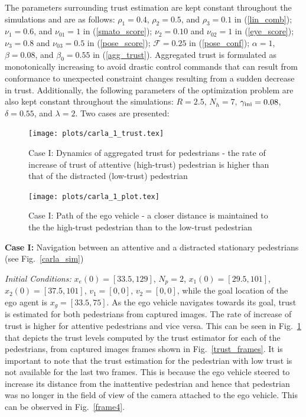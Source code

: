 \documentclass[journal]{IEEEtran}
\begin{document}
The parameters surrounding trust estimation are kept constant throughout the simulations and are as follows: $\rho_1=0.4$, $\rho_2=0.5$, and $\rho_3=0.1$ in (\ref{lin_comb}); $\nu_1=0.6$, and $\nu_{01}=1$ in (\ref{smato_score}); $\nu_2=0.10$ and $\nu_{02}=1$ in (\ref{eye_score}); $\nu_3=0.8$ and $\nu_{03}=0.5$ in (\ref{pose_score}); $\mathcal{F}=0.25$ in (\ref{pose_conf}); $\alpha=1$, $\beta=0.08$, and $\beta_0=0.55$ in (\ref{agg_trust}). Aggregated trust is formulated as monotonically increasing to avoid drastic control commands that can result from conformance to unexpected constraint changes resulting from a sudden decrease in trust. Additionally, the following parameters of the optimization problem are also kept constant throughout the simulations: $R=2.5$, $N_h=7$, $\gamma_{\rm ini}=0.08$, $\delta=0.55$, and $\lambda=2$. Two cases are presented:

\begin{figure}
  \centering
  \texttt{[image: plots/carla\_1\_trust.tex]}
  \caption{Case I: Dynamics of aggregated trust for pedestrians - the rate of increase of trust of attentive (high-trust) pedestrian is higher than that of the distracted (low-trust) pedestrian}
  \label{trust_scene1}
\end{figure}

\begin{figure}
  \centering
  \texttt{[image: plots/carla\_1\_plot.tex]}
  \caption{Case I: Path of the ego vehicle - a closer distance is maintained to the the high-trust pedestrian than to the low-trust pedestrian}
  \label{path_carla1}
\end{figure}

\textbf{Case I:} Navigation between an attentive and a distracted stationary pedestrians (see Fig.~\ref{carla_sim})

\textit{Initial Conditions: } $x_e(0) = [33.5, 129]$, $N_p = 2$, $x_1(0) = [29.5, 101]$, $x_2(0) = [37.5, 101]$, $v_1 = [0, 0]$, $v_2 = [0, 0]$, while the goal location of the ego agent is $x_g = [33.5, 75]$.
As the ego vehicle navigates towards its goal, trust is estimated for both pedestrians from captured images. The rate of increase of trust is higher for attentive pedestrians and vice versa. This can be seen in Fig.~\ref{trust_scene1} that depicts the trust levels computed by the trust estimator for each of the pedestrians, from captured images frames shown in Fig.~\ref{trust_frames}. It is important to note that the trust estimation for the pedestrian with low trust is not available for the last two frames. This is because the ego vehicle steered to increase its distance from the inattentive pedestrian and hence that pedestrian was no longer in the field of view of the camera attached to the ego vehicle. This can be observed in Fig.~\ref{frame4}. 
\end{document}
